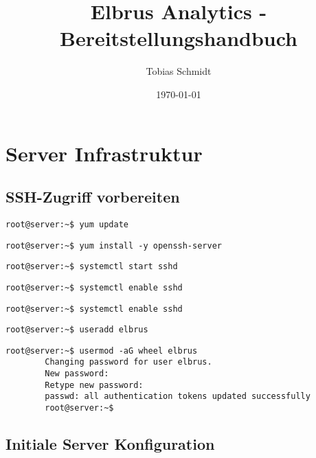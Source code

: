 \documentclass{article}
\begin{document}
	\title{Elbrus Analytics - Bereitstellungshandbuch}
	\author{Tobias Schmidt}
	\date{\today}
	\maketitle
	\newpage
	
	\section[Server Infrastruktur]{Server Infrastruktur}
	\subsection{SSH-Zugriff vorbereiten}
	\lstset{style=commands}
	\begin{lstlisting}[caption={Updaten vorhandener Packages.}]
		root@server:~$ yum update
	\end{lstlisting}
	\begin{lstlisting}[caption={Installieren des 'ssh' Packages.}]
		root@server:~$ yum install -y openssh-server
	\end{lstlisting}
	\begin{lstlisting}[caption={Starten des 'sshd' Services.}]
		root@server:~$ systemctl start sshd
	\end{lstlisting}
	\begin{lstlisting}[caption={Aktivieren des 'sshd' Services.}]
		root@server:~$ systemctl enable sshd
	\end{lstlisting}
	\begin{lstlisting}[caption={Aktivieren des 'sshd' Services.}]
		root@server:~$ systemctl enable sshd
	\end{lstlisting}
	\begin{lstlisting}[caption={Anlegen des Users Elbrus.}]
		root@server:~$ useradd elbrus
	\end{lstlisting}
	\begin{lstlisting}[caption={Hinzufügen des Users Elbrus zu der Gruppe 'wheel'.}]
		root@server:~$ usermod -aG wheel elbrus
		Changing password for user elbrus.
		New password:
		Retype new password:
		passwd: all authentication tokens updated successfully
		root@server:~$
	\end{lstlisting}
	\newpage
	
	\subsection{Initiale Server Konfiguration}
\end{document}
